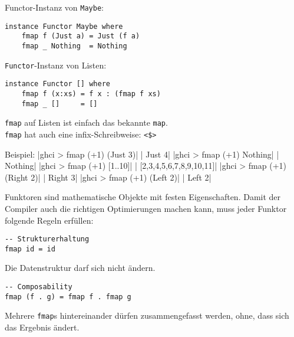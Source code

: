 \documentclass{beamer}
\begin{document}
\begin{frame}[fragile]
Functor-Instanz von \texttt{Maybe}:
\begin{verbatim}
instance Functor Maybe where
    fmap f (Just a) = Just (f a)
    fmap _ Nothing  = Nothing
\end{verbatim}
\begin{comment}
\pause
\texttt{Functor}-Instanz von Either:
\begin{verbatim}
instance Functor Either where
    fmap f (Right a) = Right (f a)
    fmap _ (Left b)  = Left b
\end{verbatim}
\end{comment}
\pause
\bigskip

\texttt{Functor}-Instanz von Listen:
\begin{verbatim}
instance Functor [] where
    fmap f (x:xs) = f x : (fmap f xs)
    fmap _ []     = []
\end{verbatim}
\pause
\texttt{fmap} auf Listen ist einfach das bekannte \texttt{map}.\\
\pause
\texttt{fmap} hat auch eine infix-Schreibweise: \texttt{<\$>}
\end{frame}


\begin{frame}[fragile]
Beispiel:
|ghci > fmap (+1) (Just 3)|
\pause
{}|       Just 4|
|ghci > fmap (+1) Nothing|
\pause
{}|       Nothing|
|ghci > fmap (+1) [1..10]|
\pause
{}|       [2,3,4,5,6,7,8,9,10,11]|
|ghci > fmap (+1) (Right 2)|
\pause
{}|       Right 3|
|ghci > fmap (+1) (Left 2)|
\pause
{}|       Left 2|
\end{frame}

\begin{frame}[fragile]
Funktoren sind mathematische Objekte mit festen Eigenschaften. Damit der Compiler auch die richtigen Optimierungen machen kann, muss jeder Funktor folgende Regeln erfüllen:\\
\pause
\begin{verbatim}
-- Strukturerhaltung
fmap id = id
\end{verbatim}
Die Datenstruktur darf sich nicht ändern.\\
\pause
\bigskip
\begin{verbatim}
-- Composability
fmap (f . g) = fmap f . fmap g
\end{verbatim}
Mehrere \texttt{fmap}s hintereinander dürfen zusammengefasst werden, ohne, dass sich das Ergebnis ändert.
\end{frame}
\end{document}
